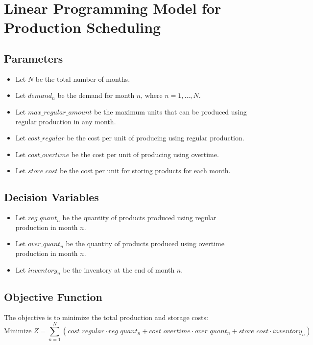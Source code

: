 \documentclass{article}
\begin{document}
\section*{Linear Programming Model for Production Scheduling}

\subsection*{Parameters}
\begin{itemize}
    \item Let $N$ be the total number of months.
    \item Let $demand_n$ be the demand for month $n$, where $n = 1, \ldots, N$.
    \item Let $max\_regular\_amount$ be the maximum units that can be produced using regular production in any month.
    \item Let $cost\_regular$ be the cost per unit of producing using regular production.
    \item Let $cost\_overtime$ be the cost per unit of producing using overtime.
    \item Let $store\_cost$ be the cost per unit for storing products for each month.
\end{itemize}

\subsection*{Decision Variables}
\begin{itemize}
    \item Let $reg\_quant_n$ be the quantity of products produced using regular production in month $n$.
    \item Let $over\_quant_n$ be the quantity of products produced using overtime production in month $n$.
    \item Let $inventory_n$ be the inventory at the end of month $n$.
\end{itemize}

\subsection*{Objective Function}
The objective is to minimize the total production and storage costs:
\[
\text{Minimize } Z = \sum_{n=1}^{N} (cost\_regular \cdot reg\_quant_n + cost\_overtime \cdot over\_quant_n + store\_cost \cdot inventory_n)
\]
\end{document}
